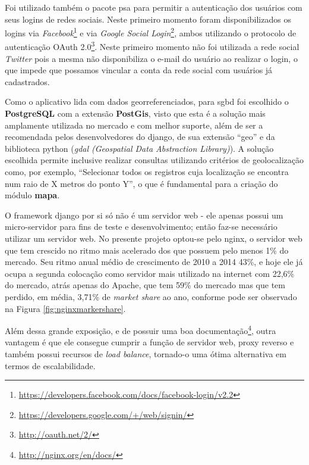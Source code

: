 Foi utilizado também o pacote \gls{psa} para permitir a autenticação dos usuários com seus logins de redes sociais. Neste primeiro momento foram disponibilizados os logins via \textit{Facebook}\footnote{\url{https://developers.facebook.com/docs/facebook-login/v2.2}} e via \textit{Google Social Login}\footnote{\url{https://developers.google.com/+/web/signin/}}, ambos utilizando o protocolo de autenticação OAuth 2.0\footnote{\url{http://oauth.net/2/}}. Neste primeiro momento não foi utilizada a rede social \textit{Twitter} pois a mesma não disponibiliza o e-mail do usuário ao realizar o login, o que impede que possamos vincular a conta da rede social com usuários já cadastrados.

Como o aplicativo lida com dados georreferenciados, para \gls{sgbd} foi escolhido o \textbf{PostgreSQL} com a extensão \textbf{PostGis}, visto que esta é a solução mais amplamente utilizada no mercado e com melhor suporte, além de ser a recomendada pelos desenvolvedores do \gls{django}, de sua extensão ``geo'' e da biblioteca python (\textit{gdal (Geospatial Data Abstraction Library)}). A solução escolhida permite inclusive realizar consultas utilizando critérios de geolocalização como, por exemplo, ``Selecionar todos os registros cuja localização se encontra num raio de X metros do ponto Y'', o que é fundamental para a criação do módulo \textbf{mapa}.

O framework \gls{django} por si só não é um servidor web - ele apenas possui um micro-servidor para fins de teste e desenvolvimento; então faz-se necessário utilizar um servidor web. No presente projeto optou-se pelo \gls{nginx}, o servidor web que tem crescido no ritmo mais acelerado dos que possuem pelo menos 1\% do mercado. Seu ritmo anual médio de crescimento de 2010 a 2014 43\%, e hoje ele já ocupa a segunda colocação como servidor mais utilizado na internet com 22,6\% do mercado, atrás apenas do Apache, que tem 59\% do mercado mas que tem perdido, em média, 3,71\% de \textit{market share} ao ano, conforme pode ser observado na Figura \ref{fig:nginxmarkershare}.


Além dessa grande exposição, e de possuir uma boa documentação\footnote{\url{http://nginx.org/en/docs/}}, outra vantagem é que ele consegue cumprir a função de servidor web, proxy reverso e também possui recursos de \textit{load balance}, tornado-o uma ótima alternativa em termos de escalabilidade.

